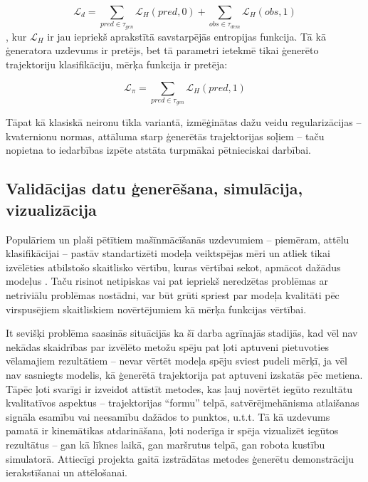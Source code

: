 \documentclass[12pt, a4paper]{article}
\numberwithin{equation}{section} %
\begin{document}
\begin{equation}
    \mathcal{L}_{d} = \sum_{pred \in \tau_{gen}} \mathcal{L}_H(pred,0) + 
    \sum_{obs \in \tau_{dem}} \mathcal{L}_H(obs,1) 
\end{equation}
, kur $\mathcal{L}_H$ ir jau iepriekš aprakstītā savstarpējās entropijas funkcija. Tā kā ģeneratora uzdevums ir pretējs, bet tā parametri ietekmē tikai ģenerēto trajektoriju klasifikāciju, mērķa funkcija ir pretēja:

\begin{equation}
    \mathcal{L}_{\pi} = \sum_{pred \in \tau_{gen}} \mathcal{L}_H(pred,1) 
\end{equation}

Tāpat kā klasiskā neironu tīkla variantā, izmēģinātas dažu veidu regularizācijas -- kvaternionu normas, attāluma starp ģenerētās trajektorijas soļiem -- taču nopietna to iedarbības izpēte atstāta turpmākai pētnieciskai darbībai.

\subsection{Validācijas datu ģenerēšana, simulācija, vizualizācija}

Populāriem un plaši pētītiem mašīnmācīšanās uzdevumiem -- piemēram, attēlu klasifikācijai -- pastāv standartizēti modeļa veiktspējas mēri un atliek tikai izvēlēties atbilstošo skaitlisko vērtību, kuras vērtībai sekot, apmācot dažādus modeļus \cite{tf_img_tutorial}. Taču risinot netipiskas vai pat iepriekš neredzētas problēmas ar netriviālu problēmas nostādni, var būt grūti spriest par modeļa kvalitāti pēc virspusējiem skaitliskiem novērtējumiem kā mērķa funkcijas vērtībai. 

It sevišķi problēma saasinās situācijās ka šī darba agrīnajās stadijās, kad vēl nav nekādas skaidrības par izvēlēto metožu spēju pat ļoti aptuveni pietuvoties vēlamajiem rezultātiem -- nevar vērtēt modeļa spēju sviest pudeli mērķī, ja vēl nav sasniegts modelis, kā ģenerētā trajektorija pat aptuveni izskatās pēc metiena. Tāpēc ļoti svarīgi ir izveidot attīstīt metodes, kas ļauj novērtēt iegūto rezultātu kvalitatīvos aspektus -- trajektorijas ``formu'' telpā, satvērējmehānisma atlaišanas signāla esamību vai neesamību dažādos to punktos, u.t.t. Tā kā uzdevums pamatā ir kinemātikas atdarināšana, ļoti noderīga ir spēja vizualizēt iegūtos rezultātus -- gan kā līknes laikā, gan maršrutus telpā, gan robota kustību simulatorā. Attiecīgi projekta gaitā izstrādātas metodes ģenerētu demonstrāciju ierakstīšanai un attēlošanai.
\end{document}
